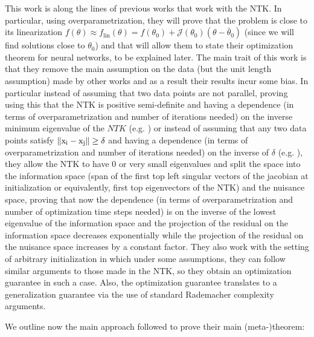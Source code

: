 \documentclass[a4paper]{article}
\begin{document}
This work is along the lines of previous works that work with the NTK. In particular, using overparametrization, they will prove that the problem is close to its linearization $f(\theta) \approx f_{\operatorname{lin}}(\theta) = f(\theta_0) + \mathcal{J}(\theta_0)(\theta - \bar{\theta}_0)$ (since we will find solutions close to $\theta_0$) and that will allow them to state their optimization theorem for neural networks, to be explained later. The main trait of this work is that they remove the main assumption on the data (but the unit length assumption) made by other works and as a result their results incur some bias. In particular instead of assuming that two data points are not parallel, proving using this that the NTK is positive semi-definite and having a dependence (in terms of overparametrization and number of iterations needed) on the inverse minimum eigenvalue of the $NTK$ (e.g. \cite{du2018gradient}) or instead of assuming that any two data points satisfy $\mathrm{\left\lVert x_i-x_j\right\rVert} \geq \delta$ and having a dependence (in terms of overparametrization and number of iterations needed) on the inverse of $\delta$ (e.g. \cite{allen2018convergence}), they allow the NTK to have $0$ or very small eigenvalues and split the space into the information space (span of the first top left singular vectors of the jacobian at initialization or equivalently, first top eigenvectors of the NTK) and the nuisance space, proving that now the dependence (in terms of overparametrization and number of optimization time steps needed) is on the inverse of the lowest eigenvalue of the information space and the projection of the residual on the information space decreases exponentially while the projection of the residual on the nuisance space increases by a constant factor. They also work with the setting of arbitrary initialization in which under some assumptions, they can follow similar arguments to those made in the NTK, so they obtain an optimization guarantee in such a case. Also, the optimization guarantee translates to a generalization guarantee via the use of standard Rademacher complexity arguments.

We outline now the main approach followed to prove their main (meta-)theorem:
\end{document}
